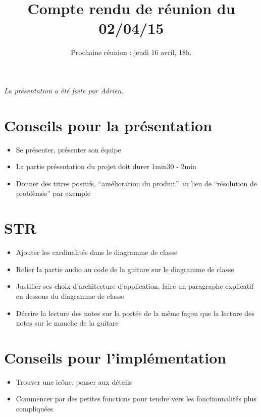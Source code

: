 \documentclass{scrartcl}
\begin{document}

\title{Compte rendu de réunion du 02/04/15}
\subtitle{Prochaine réunion : jeudi 16 avril, 18h.\vspace{-5ex}}
\date{}
\maketitle

\textit{La présentation a été faite par Adrien.}

\section{Conseils pour la présentation}
\begin{itemize}
	\item Se présenter, présenter son équipe
	\item La partie présentation du projet doit durer 1min30 - 2min
	\item Donner des titres positifs, \enquote{amélioration du produit} au lieu de \enquote{résolution de problèmes} par exemple

\end{itemize}


\section{STR}
\begin{itemize}
	\item Ajouter les cardinalités dans le diagramme de classe
	\item Relier la partie audio au code de la guitare sur le diagramme de classe
	\item Justifier ses choix d'architecture d'application, faire un paragraphe explicatif en dessous du diagramme de classe
	\item Décrire la lecture des notes sur la portée de la même façon que la lecture des notes sur le manche de la guitare
\end{itemize}

\section{Conseils pour l'implémentation}
\begin{itemize}
	\item Trouver une icône, penser aux détails
	\item Commencer par des petites fonctions pour tendre vers les fonctionnalités plus compliquées
\end{itemize}
\end{document}
